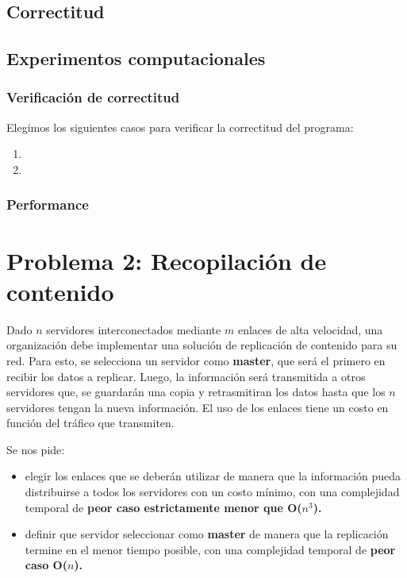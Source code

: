 \documentclass[a4paper, 10pt, twoside]{article}
\begin{document}
\subsection{Correctitud}

\subsection{Experimentos computacionales}
\subsubsection{Verificación de correctitud}

Elegimos los siguientes casos para verificar la correctitud del programa:

\begin{enumerate}
\item{}
\item{}
\end{enumerate}
\subsubsection{Performance}




\newpage

\section{Problema 2: Recopilación de contenido}

Dado $n$ servidores interconectados mediante $m$ enlaces de alta velocidad, una organización debe implementar una solución de replicación de contenido para su red. Para esto, se selecciona un servidor como \textbf{master}, que será el primero en recibir los datos a replicar. Luego, la información será transmitida a otros servidores que, se guardarán una copia y retrasmitiran los datos hasta que los $n$ servidores tengan la nueva información. El uso de los enlaces tiene un costo en función del tráfico que transmiten.

Se nos pide:
\begin{itemize}
    \item{elegir los enlaces que se deberán utilizar de manera que la información pueda distribuirse a todos los servidores con un costo mínimo, con una complejidad temporal de \textbf{peor caso estrictamente menor que O($n^3$).}}
    \item{definir que servidor seleccionar como \textbf{master} de manera que la replicación termine en el menor tiempo posible, con una complejidad temporal de \textbf{peor caso O($n$).}}
\end{itemize}
\end{document}
